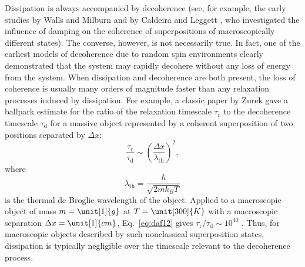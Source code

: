 \documentclass[3p,sort&compress,12pt]{elsarticle}
\begin{document}
Dissipation is always accompanied by decoherence (see, for example, the early studies by Walls and Milburn \cite{Walls:1985:pp} and by Caldeira and Leggett \cite{Caldeira:1985:tt}, who investigated  the influence of damping on the coherence of superpositions of macroscopically different states). The converse, however, is not necessarily true. In fact, one of the earliest models of decoherence due to random spin environments \cite{Zurek:1982:tv, Cucchietti:2005:om} clearly demonstrated that the system may rapidly decohere without any loss of energy from the system. When dissipation and decoherence are both present, the loss of coherence is usually many orders of magnitude faster than any relaxation processes induced by dissipation. For example, a classic paper by Zurek \cite{Zurek:1986:uz} gave a ballpark estimate for the ratio of the relaxation timescale $\tau_\text{r}$ to the decoherence timescale $\tau_\text{d}$ for a massive object represented by a coherent superposition of two positions separated by $\Delta x$:
%
\begin{equation}
  \label{eq:daf12}
  \frac{\tau_\text{r}}{\tau_\text{d}} \sim \left( \frac{\Delta
      x}{\lambda_\text{th}} \right)^2,
\end{equation}
%
where 
%
\begin{equation}
  \label{eq:daf12thermal}
\lambda_\text{th}=\frac{\hbar}{\sqrt{2mk_BT}}
\end{equation}
%
is the thermal de Broglie wavelength of the object. Applied to a macroscopic object of mass $m = \unit[1]{g}$ at $T=\unit[300]{K}$ with a macroscopic separation $\Delta x =\unit[1]{cm}$, Eq.~\eqref{eq:daf12} gives $\tau_\text{r}/\tau_\text{d} \sim10^{40}$ \cite{Zurek:1986:uz}. Thus, for macroscopic objects described by such nonclassical superposition states, dissipation is typically negligible over the timescale relevant to the decoherence process.
\end{document}
